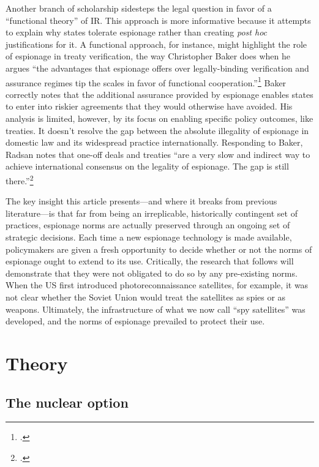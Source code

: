 \documentclass[14pt]{extarticle}
\begin{document}
Another branch of scholarship sidesteps the legal question in favor of a \enquote{functional theory} of IR. This approach is more informative because it attempts to explain why states tolerate espionage rather than creating \emph{post hoc} justifications for it. A functional approach, for instance, might highlight the role of espionage in treaty verification, the way Christopher Baker does when he argues \enquote{the advantages that espionage offers over legally-binding verification and assurance regimes tip the scales in favor of functional cooperation.}\footcite{baker_tolerance_2004} Baker correctly notes that the additional assurance provided by espionage enables states to enter into riskier agreements that they would otherwise have avoided. His analysis is limited, however, by its focus on enabling specific policy outcomes, like treaties. It doesn't resolve the gap between the absolute illegality of espionage in domestic law and its widespread practice internationally. Responding to Baker, Radsan notes that one-off deals and treaties \enquote{are a very slow and indirect way to achieve international consensus on the legality of espionage. The gap is still there.}\footcite[p.~607]{radsan_unresolved_2007}

The key insight this article presents---and where it breaks from previous literature---is that far from being an irreplicable, historically contingent set of practices, espionage norms are actually preserved through an ongoing set of strategic decisions. Each time a new espionage technology is made available, policymakers are given a fresh opportunity to decide whether or not the norms of espionage ought to extend to its use. Critically, the research that follows will demonstrate that they were not obligated to do so by any pre-existing norms. When the US first introduced photoreconnaissance satellites, for example, it was not clear whether the Soviet Union would treat the satellites as spies or as weapons. Ultimately, the infrastructure of what we now call \enquote{spy satellites} was developed, and the norms of espionage prevailed to protect their use.

\section{Theory}
\subsection{The nuclear option}
\end{document}
